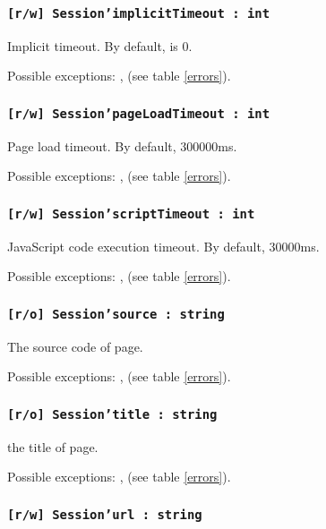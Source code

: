 \subsubsection{\texttt{[r/w] Session'implicitTimeout : int}}

Implicit timeout. By default, is 0.

Possible exceptions: ,  (see table \ref{errors}).

\subsubsection{\texttt{[r/w] Session'pageLoadTimeout : int}}

Page load timeout. By default, 300000ms.

Possible exceptions: ,  (see table \ref{errors}).

\subsubsection{\texttt{[r/w] Session'scriptTimeout : int}}

JavaScript code execution timeout. By default, 30000ms.

Possible exceptions: ,  (see table \ref{errors}).

\subsubsection{\texttt{[r/o] Session'source : string}}

The source code of page.

Possible exceptions: ,  (see table \ref{errors}).

\subsubsection{\texttt{[r/o] Session'title : string}}

the title of page.

Possible exceptions: ,  (see table \ref{errors}).

\subsubsection{\texttt{[r/w] Session'url : string}}

